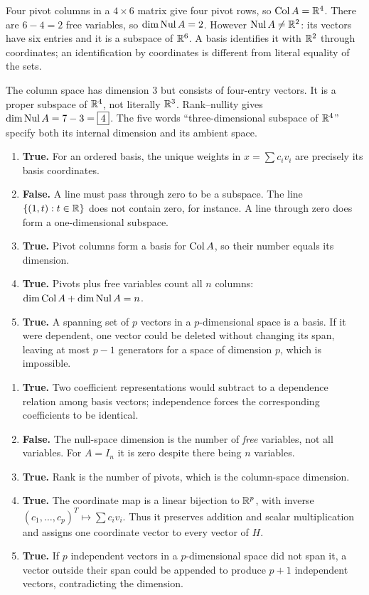 Four pivot columns in a $4\times6$ matrix give four pivot rows,
so $\operatorname{Col} A=\mathbb{R}^4$. There are $6-4=2$ free variables,
so $\dim\operatorname{Nul} A=2$. However $\operatorname{Nul} A\ne\mathbb{R}^2$:
its vectors have six entries and it is a subspace of $\mathbb{R}^6$.
A basis identifies it with $\mathbb{R}^2$ through coordinates; an identification
by coordinates is different from literal equality of the sets.

The column space has dimension $3$ but consists of four-entry vectors.
It is a proper subspace of $\mathbb{R}^4$, not literally $\mathbb{R}^3$.
Rank--nullity gives $\dim\operatorname{Nul} A=7-3=\boxed4$.
The five words ``three-dimensional subspace of $\mathbb{R}^4$'' specify both
its internal dimension and its ambient space.

\begin{enumerate}[label=(\alph*)]
\item \textbf{True.} For an ordered basis, the unique weights in
$x=\sum c_iv_i$ are precisely its basis coordinates.
\item \textbf{False.} A line must pass through zero to be a subspace.
The line $\{(1,t):t\in\mathbb{R}\}$ does not contain zero, for instance.
A line through zero does form a one-dimensional subspace.
\item \textbf{True.} Pivot columns form a basis for $\operatorname{Col} A$,
so their number equals its dimension.
\item \textbf{True.} Pivots plus free variables count all $n$ columns:
$\dim\operatorname{Col} A+\dim\operatorname{Nul} A=n$.
\item \textbf{True.} A spanning set of $p$ vectors in a $p$-dimensional
space is a basis. If it were dependent, one vector could be deleted without
changing its span, leaving at most $p-1$ generators for a space of dimension $p$,
which is impossible.
\end{enumerate}

\begin{enumerate}[label=(\alph*)]
\item \textbf{True.} Two coefficient representations would subtract
to a dependence relation among basis vectors; independence forces the
corresponding coefficients to be identical.
\item \textbf{False.} The null-space dimension is the number of
\emph{free} variables, not all variables. For $A=I_n$ it is zero despite
there being $n$ variables.
\item \textbf{True.} Rank is the number of pivots, which is the
column-space dimension.
\item \textbf{True.} The coordinate map is a linear bijection to
$\mathbb{R}^p$, with inverse $(c_1,\ldots,c_p)^T\mapsto\sum c_iv_i$.
Thus it preserves addition and scalar multiplication and assigns one
coordinate vector to every vector of $H$.
\item \textbf{True.} If $p$ independent vectors in a $p$-dimensional
space did not span it, a vector outside their span could be appended to
produce $p+1$ independent vectors, contradicting the dimension.
\end{enumerate}

